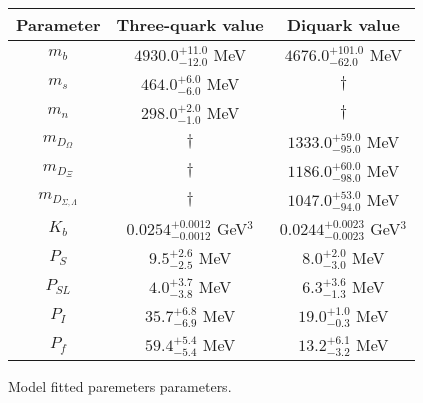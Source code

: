 \begin{tabular}{c | c c}\hline \hline
 Parameter  &  Three-quark value       & Diquark value    \\ \hline
 $m_{b}$ & $4930.0^{+11.0}_{-12.0}$ MeV & $4676.0^{+101.0}_{-62.0}$ MeV \\ 
 $m_{s}$ & $464.0^{+6.0}_{-6.0}$ MeV & $\dagger$ \\ 
 $m_{n}$ & $298.0^{+2.0}_{-1.0}$ MeV & $\dagger$ \\ 
 $m_{D_{\Omega}}$          & $\dagger$ & $1333.0^{+59.0}_{-95.0}$ MeV \\ 
 $m_{D_{\Xi}}$             & $\dagger$ & $1186.0^{+60.0}_{-98.0}$ MeV \\ 
 $m_{D_{\Sigma,\Lambda}}$ & $\dagger$ & $1047.0^{+53.0}_{-94.0}$ MeV \\ 
 $K_b$   & $0.0254^{+0.0012}_{-0.0012}$ GeV$^{3}$ & $0.0244^{+0.0023}_{-0.0023}$ GeV$^{3}$ \\ 
 $P_S$     & $9.5^{+2.6}_{-2.5}$ MeV & $8.0^{+2.0}_{-3.0}$ MeV \\ 
 $P_{SL}$     & $4.0^{+3.7}_{-3.8}$ MeV & $6.3^{+3.6}_{-1.3}$ MeV \\ 
 $P_{I}$     & $35.7^{+6.8}_{-6.9}$ MeV & $19.0^{+1.0}_{-0.3}$ MeV \\ 
 $P_{f}$     & $59.4^{+5.4}_{-5.4}$ MeV & $13.2^{+6.1}_{-3.2}$ MeV \\ 
\hline\hline
\end{tabular}
\caption{Model fitted paremeters parameters.}
\label{tab:comb_fit}
